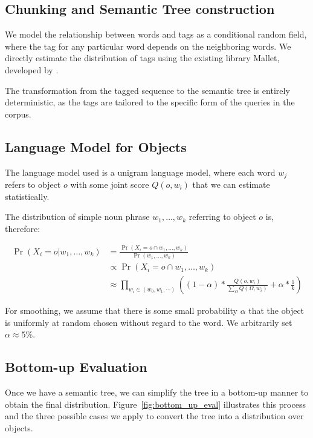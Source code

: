 \documentclass[letterpaper,10pt]{article}
\begin{document}

\subsection{Chunking and Semantic Tree construction}
\label{sec:tagging}

We model the relationship between words and tags as a conditional random field, where the tag for any particular word depends on the neighboring words. We directly estimate the distribution of tags using the existing library Mallet, developed by \citet{McCallumMALLET}.

The transformation from the tagged sequence to the semantic tree is entirely deterministic, as the tags are tailored to the specific form of the queries in the corpus.

\subsection{Language Model for Objects}
\label{sec:langmod_obj}
\label{sec:unigram}

The language model used is a unigram language model, where each word $w_j$ refers to object $o$ with some joint score $Q(o, w_i)$ that we can estimate statistically. 

The distribution of simple noun phrase $w_1, \ldots, w_k$ referring to object $o$ is, therefore:

\begin{align*}
	\Pr(X_i = o | w_1, \ldots, w_k) & = \frac{\Pr(X_i = o \cap w_1, \ldots, w_k)}{\Pr(w_1, \ldots, w_k)}
\\ & \propto \Pr(X_i = o \cap w_1, \ldots, w_k)
\\ & \approx \prod_{w_i \in (w_0, w_1, \cdots)} \left( (1 - \alpha) * \frac{Q(o, w_i)}{\sum_{\Omega} Q(\Omega, w_i)} + \alpha * \frac{1}{k} \right)
\end{align*}

For smoothing, we assume that there is some small probability $\alpha$ that the object is uniformly at random chosen without regard to the word. We arbitrarily set $\alpha \approx 5\%$.

\subsection{Bottom-up Evaluation}
\label{sec:bottomupeval}
Once we have a semantic tree, we can simplify the tree in a bottom-up manner to obtain the final distribution. Figure~\ref{fig:bottom_up_eval} illustrates this process and the three possible cases we apply to convert the tree into a distribution over objects.
\end{document}
